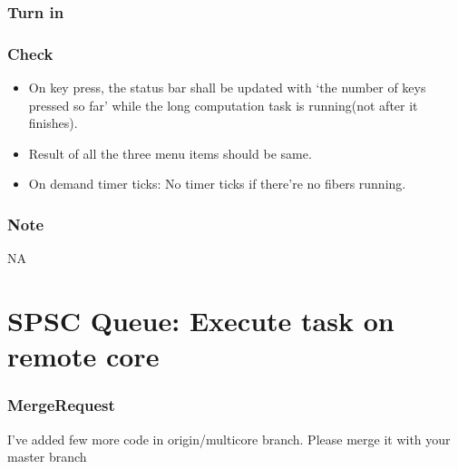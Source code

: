 \documentclass[]{book}
\newenvironment{Shaded}{}{}
\newcommand{\KeywordTok}[1]{\textbf{{#1}}}
\newcommand{\NormalTok}[1]{{#1}}
\begin{document}
\subsubsection*{Turn in}\label{turn-in-7}

\subsubsection*{Check}\label{check-7}

\begin{itemize}
\itemsep1pt\parskip0pt
\item
  On key press, the status bar shall be updated with `the number of keys
  pressed so far' while the long computation task is running(not after
  it finishes).
\item
  Result of all the three menu items should be same.
\item
  On demand timer ticks: No timer ticks if there're no fibers running.
\end{itemize}

\subsubsection*{Note}\label{note-9}

NA

\section{SPSC Queue: Execute task on remote
core}\label{spsc-queue-execute-task-on-remote-core}

\subsubsection*{MergeRequest}\label{mergerequest-8}

I've added few more code in origin/multicore branch. Please merge it
with your master branch

\begin{Shaded}
\end{Shaded}
\end{document}
